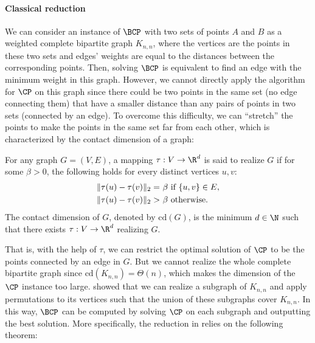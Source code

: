 \paragraph{Classical reduction} 
We can consider an instance of $\BCP$ with two sets of points $A$ and $B$ as a weighted complete bipartite graph $K_{n,n}$, where the vertices are the points in these two sets and edges' weights are equal to the distances between the corresponding points. Then, solving $\BCP$ is equivalent to find an edge with the minimum weight in this graph.  
However, we cannot directly apply the algorithm for $\CP$ on this graph since there could be two points in the same set (no edge connecting them) that have a smaller distance than any pairs of points in two sets (connected by an edge). To overcome this difficulty, we can ``stretch'' the points to make the points in the same set far from each other, which is characterized by the contact dimension of a graph:
\begin{definition}\label{def:contact_dim}
For any graph $G=(V,E)$, a mapping $\tau:V\rightarrow \R^d$ is said to realize $G$ if for some $\beta>0$, the following holds for every distinct vertices $u,v$:
\begin{align}
    \|\tau(u)-\tau(v)\|_2  =&~\beta ~ \text{if~} \{u,v\}\in E,\\
    \|\tau(u)-\tau(v)\|_2  > &~\beta ~ \text{otherwise.}\notag
\end{align}
The contact dimension of $G$, denoted by $\mathrm{cd}(G)$, is the minimum $d\in \N$ such that there exists $\tau:V\rightarrow \R^d$ realizing $G$.
\end{definition}
That is, with the help of $\tau$, we can restrict the optimal solution of $\CP$ to be the points connected by an edge in $G$. But we cannot realize the whole complete bipartite graph since $\mathrm{cd}(K_{n,n})=\Theta(n)$, which makes the dimension of the $\CP$ instance too large. \cite{r29} showed that we can realize a subgraph of $K_{n,n}$ and apply permutations to its vertices such that the union of these subgraphs cover $K_{n,n}$. In this way, $\BCP$ can be computed by solving $\CP$ on each subgraph and outputting the best solution. More specifically, the reduction in \cite{r29} relies on the following theorem:

